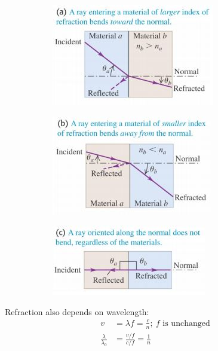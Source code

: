 \documentclass[a4paper, 11pt, normalem]{report}
\begin{document}
\begin{figure}[H]
    \centering
    \begin{subfigure}{0.3\textwidth}
        \includegraphics[width=\textwidth]{Refrac1.jpg}
    \end{subfigure}
    \begin{subfigure}{0.3\textwidth}
        \includegraphics[width=\textwidth]{Refrac2.jpg}
    \end{subfigure}
    \begin{subfigure}{0.3\textwidth}
        \includegraphics[width=\textwidth]{Refrac3.jpg}
    \end{subfigure}
\end{figure}
Refraction also depends on wavelength:
\begin{align}
    v &= \lambda f = \frac{c}{n};~f\text{ is unchanged} \\
    \frac{\lambda}{\lambda_{0}} &= \frac{v/f}{c/f} = \frac{1}{n}
\end{align}
\end{document}
